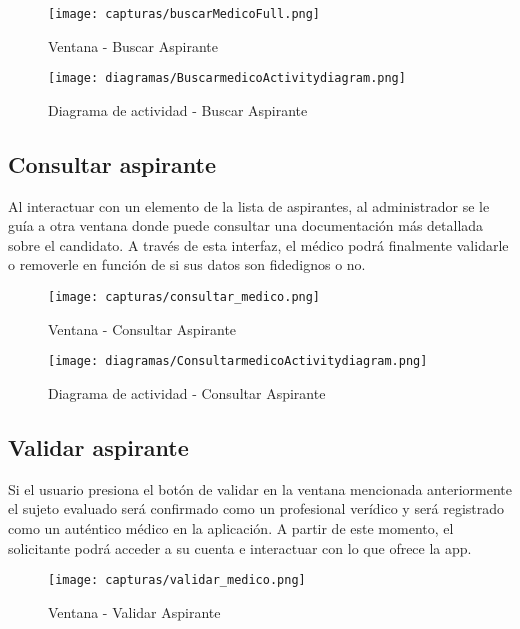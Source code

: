 \documentclass[11pt,spanish,
		listoftables,listoffigures]
		{tfgplantilla}
\begin{document}
\begin{figure}[H]
\centering
\texttt{[image: capturas/buscarMedicoFull.png]}
\caption{Ventana -  Buscar Aspirante}
\end{figure}

\newpage
\begin{figure}[H]
\centering
\texttt{[image: diagramas/BuscarmedicoActivitydiagram.png]}
\caption{Diagrama de actividad -  Buscar Aspirante}
\end{figure}

\vfill
\subsection {Consultar aspirante}

Al interactuar con un elemento de la lista de aspirantes, al administrador se le guía a otra ventana donde puede consultar una documentación más detallada sobre el candidato. A través de esta interfaz, el médico podrá finalmente validarle o removerle en función de si sus datos son fidedignos o no. 

\begin{figure}[H]
\centering
\texttt{[image: capturas/consultar\_medico.png]}
\caption{Ventana -  Consultar Aspirante}
\end{figure}

\begin{figure}[H]
\centering
\texttt{[image: diagramas/ConsultarmedicoActivitydiagram.png]}
\caption{Diagrama de actividad -  Consultar Aspirante}
\end{figure}

\vfill
\subsection {Validar aspirante}

Si el usuario presiona el botón de validar en la ventana mencionada anteriormente el sujeto evaluado será confirmado como un profesional verídico y será registrado como un auténtico médico en la aplicación. A partir de este momento, el solicitante podrá acceder a su cuenta e interactuar con lo que ofrece la app. 

\begin{figure}[H]
\centering
\texttt{[image: capturas/validar\_medico.png]}
\caption{Ventana -  Validar Aspirante}
\end{figure}
\end{document}

